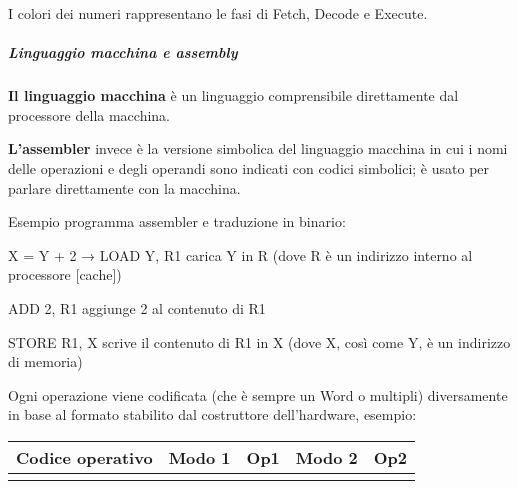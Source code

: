 I colori dei numeri rappresentano le fasi di Fetch, Decode e Execute.

\subparagraph{\texorpdfstring{\emph{Linguaggio macchina e
assembly}}{Linguaggio macchina e assembly}}\label{linguaggio-macchina-e-assembly}

\textbf{Il linguaggio macchina} è un linguaggio comprensibile
direttamente dal processore della macchina.

\textbf{L'assembler} invece è la versione simbolica del linguaggio
macchina in cui i nomi delle operazioni e degli operandi sono indicati
con codici simbolici; è usato per parlare direttamente con la macchina.

Esempio programma assembler e traduzione in binario:

X = Y + 2 → LOAD Y, R1 carica Y in R (dove R è un indirizzo interno al
processore {[}cache{]})

ADD 2, R1 aggiunge 2 al contenuto di R1

STORE R1, X scrive il contenuto di R1 in X (dove X, così come Y, è un
indirizzo di memoria)

Ogni operazione viene codificata (che è sempre un Word o multipli)
diversamente in base al formato stabilito dal costruttore dell'hardware,
esempio:

\begin{longtable}[]{@{}
  >{\raggedright\arraybackslash}p{}
  >{\raggedright\arraybackslash}p{}
  >{\raggedright\arraybackslash}p{}
  >{\raggedright\arraybackslash}p{}
  >{\raggedright\arraybackslash}p{}@{}}
\toprule\noalign{}
\begin{minipage}[b]{\linewidth}\centering
\textbf{Codice operativo}
\end{minipage} & \begin{minipage}[b]{\linewidth}\centering
\textbf{Modo 1}
\end{minipage} & \begin{minipage}[b]{\linewidth}\centering
\textbf{Op1}
\end{minipage} & \begin{minipage}[b]{\linewidth}\centering
\textbf{Modo 2}
\end{minipage} & \begin{minipage}[b]{\linewidth}\centering
\textbf{Op2}
\end{minipage} \\
\midrule\noalign{}
\endhead
\bottomrule\noalign{}
\endlastfoot
\end{longtable}

